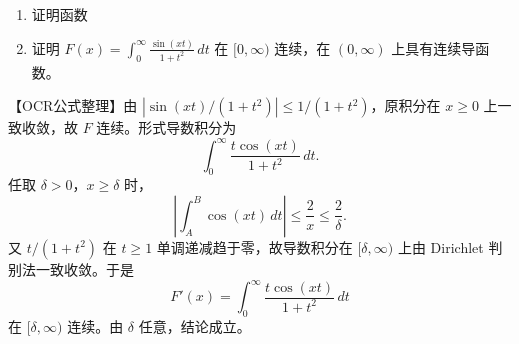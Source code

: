 \documentclass[11pt,fontset=fandol]{ctexart}
\begin{document}
\begin{enumerate}
\def\labelenumi{\arabic{enumi}.}
\setcounter{enumi}{4}
\item
  证明函数
\item
  证明 \(F(x)=\int_0^\infty\frac{\sin(xt)}{1+t^2}\,dt\) 在
  \([0,\infty)\) 连续，在 \((0,\infty)\) 上具有连续导函数。
\end{enumerate}

【OCR公式整理】由 \(|\sin(xt)/(1+t^2)|\le1/(1+t^2)\)，原积分在 \(x\ge0\)
上一致收敛，故 \(F\) 连续。形式导数积分为 \[
\int_0^\infty\frac{t\cos(xt)}{1+t^2}\,dt.
\] 任取 \(\delta>0\)，\(x\ge\delta\) 时， \[
\left|\int_A^B\cos(xt)\,dt\right|\le\frac2x\le\frac2\delta.
\] 又 \(t/(1+t^2)\) 在 \(t\ge1\) 单调递减趋于零，故导数积分在
\([\delta,\infty)\) 上由 Dirichlet 判别法一致收敛。于是 \[
F'(x)=\int_0^\infty\frac{t\cos(xt)}{1+t^2}\,dt
\] 在 \([\delta,\infty)\) 连续。由 \(\delta\) 任意，结论成立。
\end{document}
